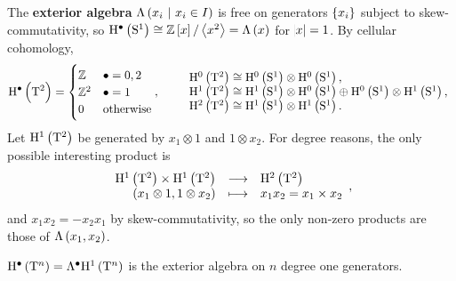 \begin{example*}
The \textbf{exterior algebra} $ \Lambda\br{x_i \st x_i \in I} $ is free on generators $ \cbr{x_i} $ subject to skew-commutativity, so $ \H^\bullet\br{\S^1} \cong \ZZ\sbr{x} / \abr{x^2} = \Lambda\br{x} $ for $ \abs{x} = 1 $. By cellular cohomology,
$$ \H^\bullet\br{\T^2} =
\begin{cases}
\ZZ & \bullet = 0, 2 \\
\ZZ^2 & \bullet = 1 \\
0 & \text{otherwise}
\end{cases},
\qquad
\begin{array}{l}
\H^0\br{\T^2} \cong \H^0\br{\S^1} \otimes \H^0\br{\S^1}, \\
\H^1\br{\T^2} \cong \H^1\br{\S^1} \otimes \H^0\br{\S^1} \oplus \H^0\br{\S^1} \otimes \H^1\br{\S^1}, \\
\H^2\br{\T^2} \cong \H^1\br{\S^1} \otimes \H^1\br{\S^1}.
\end{array}
$$
Let $ \H^1\br{\T^2} $ be generated by $ x_1 \otimes 1 $ and $ 1 \otimes x_2 $. For degree reasons, the only possible interesting product is
$$ \function{\H^1\br{\T^2} \times \H^1\br{\T^2}}{\H^2\br{\T^2}}{\br{x_1 \otimes 1, 1 \otimes x_2}}{x_1x_2 = x_1 \times x_2}, $$
and $ x_1x_2 = -x_2x_1 $ by skew-commutativity, so the only non-zero products are those of $ \Lambda\br{x_1, x_2} $.
\end{example*}

\begin{corollary}
$ \H^\bullet\br{\T^n} = \Lambda^\bullet\H^1\br{\T^n} $ is the exterior algebra on $ n $ degree one generators.
\end{corollary}

